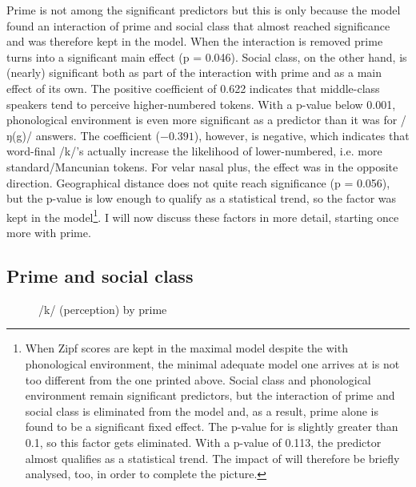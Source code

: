 Prime is not among the significant predictors but this is only because the model found an interaction of prime and social class that almost reached significance and was therefore kept in the model.
When the interaction is removed prime turns into a significant main effect (p = 0.046).
Social class, on the other hand, is (nearly) significant both as part of the interaction with prime and as a main effect of its own.
The positive coefficient of 0.622 indicates that middle-class speakers tend to perceive higher-numbered tokens.
With a p-value below 0.001, phonological environment is even more significant as a predictor than it was for /ŋ(g)/ answers.
The coefficient (\ensuremath{-0.391}), however, is negative, which indicates that word-final /k/'s actually increase the likelihood of lower-numbered, i.e. more standard/Mancunian tokens.
For velar nasal plus, the effect was in the opposite direction.
Geographical distance does not quite reach significance (p = 0.056), but the p-value is low enough to qualify as a statistical trend, so the factor was kept in the model\footnote{When Zipf scores are kept in the maximal model despite the  with phonological environment, the minimal adequate model one arrives at is not too different from the one printed above. Social class and phonological environment remain significant predictors, but the interaction of prime and social class is eliminated from the model and, as a result, prime alone is found to be a significant fixed effect. The p-value for  is slightly greater than 0.1, so this factor gets eliminated. With a p-value of 0.113, the predictor  almost qualifies as a statistical trend. The impact of  will therefore be briefly analysed, too, in order to complete the picture.}.
I will now discuss these factors in more detail, starting once more with prime.

\subsection{Prime and social class}
\label{sec.perc_res.k.prime}

\begin{figure}[h]
	\centering
		\resizebox{.49\linewidth}{!}{} 
	\caption{/k/ (perception) by prime}
	\label{fig.bar.k.tot.ext}
\end{figure}

